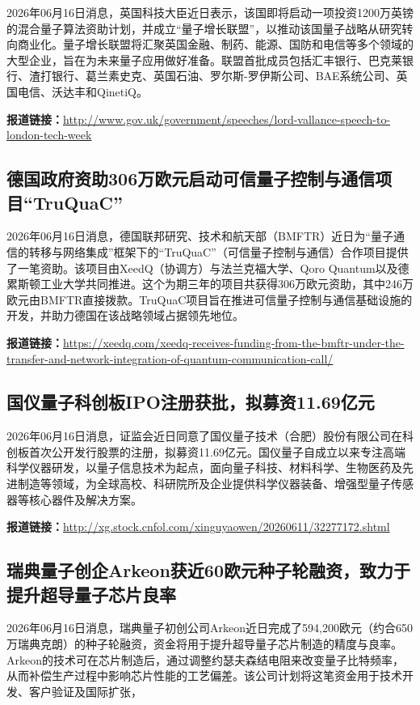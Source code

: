 \documentclass[12pt,a4paper]{ctexart}
\begin{document}
2026年06月16日消息，英国科技大臣近日表示，该国即将启动一项投资1200万英镑的混合量子算法资助计划，并成立“量子增长联盟”，以推动该国量子战略从研究转向商业化。量子增长联盟将汇聚英国金融、制药、能源、国防和电信等多个领域的大型企业，旨在为未来量子应用做好准备。联盟首批成员包括汇丰银行、巴克莱银行、渣打银行、葛兰素史克、英国石油、罗尔斯-罗伊斯公司、BAE系统公司、英国电信、沃达丰和QinetiQ。

\noindent\textbf{报道链接：}\url{http://www.gov.uk/government/speeches/lord-vallance-speech-to-london-tech-week}

\subsection{ 德国政府资助306万欧元启动可信量子控制与通信项目“TruQuaC” }

2026年06月16日消息，德国联邦研究、技术和航天部（BMFTR）近日为“量子通信的转移与网络集成”框架下的“TruQuaC”（可信量子控制与通信）合作项目提供了一笔资助。该项目由XeedQ（协调方）与法兰克福大学、Qoro Quantum以及德累斯顿工业大学共同推进。这个为期三年的项目共获得306万欧元资助，其中246万欧元由BMFTR直接拨款。TruQuaC项目旨在推进可信量子控制与通信基础设施的开发，并助力德国在该战略领域占据领先地位。

\noindent\textbf{报道链接：}\url{https://xeedq.com/xeedq-receives-funding-from-the-bmftr-under-the-transfer-and-network-integration-of-quantum-communication-call/}

\subsection{ 国仪量子科创板IPO注册获批，拟募资11.69亿元 }

2026年06月16日消息，证监会近日同意了国仪量子技术（合肥）股份有限公司在科创板首次公开发行股票的注册，拟募资11.69亿元。国仪量子自成立以来专注高端科学仪器研发，以量子信息技术为起点，面向量子科技、材料科学、生物医药及先进制造等领域，为全球高校、科研院所及企业提供科学仪器装备、增强型量子传感器等核心器件及解决方案。

\noindent\textbf{报道链接：}\url{http://xg.stock.cnfol.com/xinguyaowen/20260611/32277172.shtml}

\subsection{ 瑞典量子创企Arkeon获近60欧元种子轮融资，致力于提升超导量子芯片良率 }

2026年06月16日消息，瑞典量子初创公司Arkeon近日完成了594,200欧元（约合650万瑞典克朗）的种子轮融资，资金将用于提升超导量子芯片制造的精度与良率。Arkeon的技术可在芯片制造后，通过调整约瑟夫森结电阻来改变量子比特频率，从而补偿生产过程中影响芯片性能的工艺偏差。该公司计划将这笔资金用于技术开发、客户验证及国际扩张，
\end{document}
